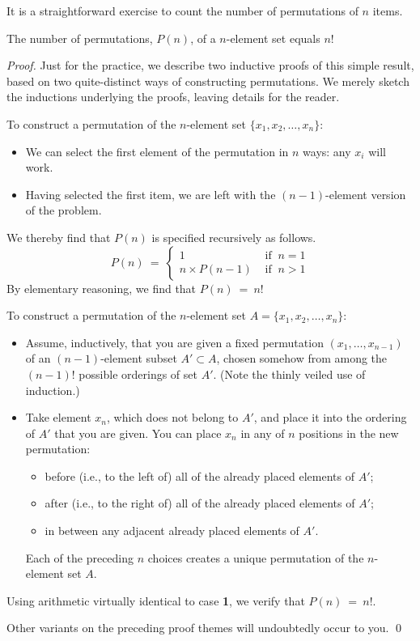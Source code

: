 It is a straightforward exercise to count the number of permutations of $n$ items.

\begin{prop}
\label{thm:no-permutation}
The number of permutations, $P(n)$, of a $n$-element set equals $n!$
\end{prop}

\begin{proof}
Just for the practice, we describe two inductive proofs of this simple result, based on two quite-distinct ways of constructing permutations.  We merely sketch the inductions underlying the proofs, leaving details for the reader.

\medskip

To construct a permutation of the $n$-element set $\{ x_1, x_2, \ldots , x_n\}$:
\begin{itemize}
\item
We can select the first element of the permutation in $n$ ways: any $x_i$ will work.
\medskip\item
Having selected the first item, we are left with the $(n-1)$-element version of the problem.
\end{itemize}
We thereby find that $P(n)$ is specified recursively as follows.
\[
P(n) \ = \ \left\{
\begin{array}{cl}
1 & \mbox{ if } \ n=1 \\
n \times P(n-1) & \mbox{ if } \ n>1
\end{array}
\right.
\]
By elementary reasoning, we find that $P(n) \ = \ n!$

\bigskip

To construct a permutation of the $n$-element set $A = \{ x_1, x_2, \ldots , x_n\}$:
\begin{itemize}
\item
Assume, inductively, that you are given a fixed  permutation $(x_1, \ldots , x_{n-1})$ of an $(n-1)$-element subset $A'  \subset A$, chosen somehow from among the $(n-1)!$ possible orderings of set $A'$.  (Note the thinly veiled use of induction.)
\medskip\item
Take element $x_n$, which does not belong to $A'$, and place it into the ordering of $A'$ that you are given.  You can place $x_n$ in any of $n$ positions in the new permutation:
  \begin{itemize}
  \item
before (i.e., to the left of) all of the already placed elements of $A'$;
  \medskip\item
after (i.e., to the right of) all of the already placed elements of $A'$;
  \medskip\item
in between any adjacent already placed elements of $A'$.
  \end{itemize}
Each of the preceding $n$ choices creates a unique permutation of the $n$-element set $A$.
\end{itemize}
Using arithmetic virtually identical to case {\bf 1}, we verify that $P(n) \ = \ n!$.

\medskip

\noindent
Other variants on the preceding proof themes will undoubtedly occur to you.   \qed
\end{proof}

